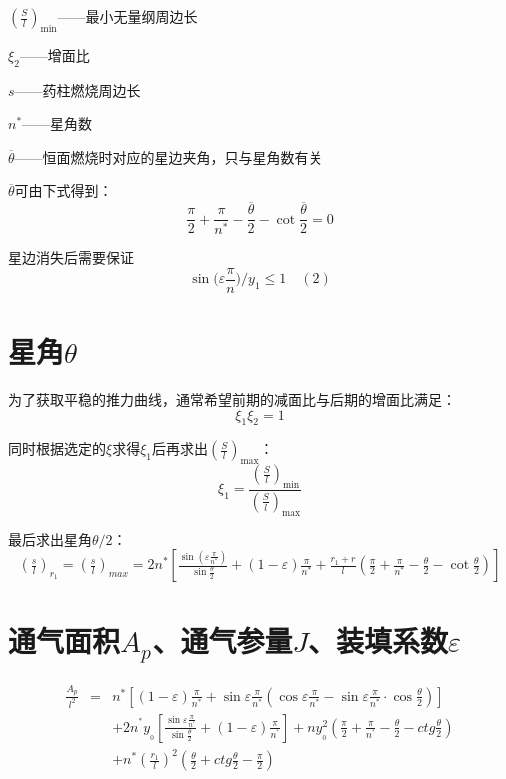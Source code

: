 ${\left( \frac{S}{l} \right) _{\min}}$——最小无量纲周边长

\vspace{0.8em}
$\xi _2$——增面比

$s$——药柱燃烧周边长

$n^*$——星角数

$\overline{\theta}$——恒面燃烧时对应的星边夹角，只与星角数有关

$\overline{\theta}$可由下式得到：
\[
\frac{\pi}{2}+\frac{\pi}{n^*}-\frac{\overline{\theta }}{2}-\cot \frac{\overline{\theta }}{2}=0
\]

星边消失后需要保证
\[
\sin\mathrm{(}\varepsilon \frac{\pi}{n})/y_1\leqslant 1\hspace{1em}(2)
\]

\section{星角\texorpdfstring{$\theta$}{}}

为了获取平稳的推力曲线，通常希望前期的减面比与后期的增面比满足：
\[
\xi _1\xi _2=1
\]

同时根据选定的$\xi$求得$\xi_{1}$后再求出$\left( \frac{S}{l} \right) _{\max}$：
\[
\xi _1=\frac{\left( \frac{S}{l} \right) _{\min}}{\left( \frac{S}{l} \right) _{\max}}
\]

最后求出星角$\theta /2$：
\begingroup
\fontsize{16}{14}\selectfont 
\[
\left( \tfrac{s}{l} \right) _{r_1}=\left( \tfrac{s}{l} \right) _{max}=2n^*\left[ \tfrac{\sin \left( \varepsilon \frac{\pi}{n^*} \right)}{\sin \frac{\theta}{2}}+\left( 1-\varepsilon \right) \tfrac{\pi}{n^*}+\tfrac{r_1+r}{l}\left( \tfrac{\pi}{2}+\tfrac{\pi}{n^*}-\tfrac{\theta}{2}-\cot\tfrac{\theta}{2} \right) \right] 
\]
\endgroup
\section{通气面积$A_{p}$、通气参量$J$、装填系数\texorpdfstring{$\varepsilon$}{}}

\begingroup
\fontsize{16}{14}\selectfont 

\[
  \begin{array}{ccl}
    \frac{A_p}{l^2}&		=&		n^*\left[ \left( 1-\varepsilon \right) \frac{\pi}{n^*}+\sin \varepsilon \frac{\pi}{n^*}\left( \cos \varepsilon \frac{\pi}{n^*}-\sin \varepsilon \frac{\pi}{n^*}\cdot \cos \frac{\theta}{2} \right) \right]\\[1em]
    &		&		+2n^{^*}y_{_0}\left[ \frac{\sin \varepsilon \frac{\pi}{n^{^*}}}{\sin \frac{\theta}{2}}+(1-\varepsilon )\frac{\pi}{n^{^*}} \right] +ny_{_0}^{2}\left( \frac{\pi}{2}+\frac{\pi}{n^{^*}}-\frac{\theta}{2}-ctg\frac{\theta}{2} \right)\\[1em]
    &		&		+n^*\left( \frac{r_1}{l} \right) ^2\left( \frac{\theta}{2}+ctg\frac{\theta}{2}-\frac{\pi}{2} \right)\\
  \end{array}
  \]

